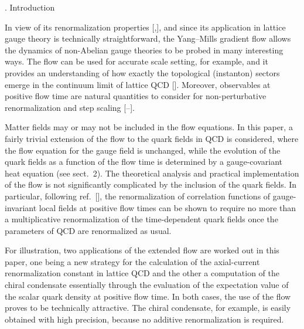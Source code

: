 

. Introduction

In view of its renormalization properties 
[\cite{WilsonFlow},\cite{RenFlow}], and since
its application in lattice gauge theory is technically straightforward,
the Yang--Mills gradient flow allows the dynamics of non-Abelian
gauge theories to be probed in many interesting ways.
The flow can be used for accurate scale setting, for example,
and it provides an understanding of how exactly
the topological (instanton) sectors emerge in
the continuum limit of lattice QCD
[\cite{WilsonFlow}]\kern1pt.
Moreover, observables at positive flow time 
are natural quantities to consider for non-perturbative
renormalization and step scaling 
[\cite{StepScaling}--\cite{FritzschRamos}].

Matter fields may or may not be included in the flow equations.
In this paper, a fairly trivial extension of the flow to the 
quark fields in QCD is considered,
where the flow equation for the
gauge field is unchanged, while the evolution of 
the quark fields as a function of the flow time is determined
by a gauge-covariant heat equation (see sect.~2).
The theoretical analysis and practical implementation of the flow 
is not significantly complicated by
the inclusion of the quark fields. In particular,
following ref.~[\cite{RenFlow}], the renormalization of
correlation functions of gauge-invariant local fields at
positive flow times can be shown to require no more than
a multiplicative renormalization of
the time-dependent quark fields once
the parameters of QCD are renormalized as usual.

For illustration, two applications of the extended flow 
are worked out in this paper,
one being a new strategy for the
calculation of the axial-current renormalization constant
in lattice QCD
and the other a computation of the chiral condensate
essentially
through the evaluation of the expectation
value of the scalar quark density at positive flow time.
In both cases, the use of the flow proves to be
technically attractive.
The chiral condensate, for example, is easily obtained with
high precision, because no additive renormalization is required.

